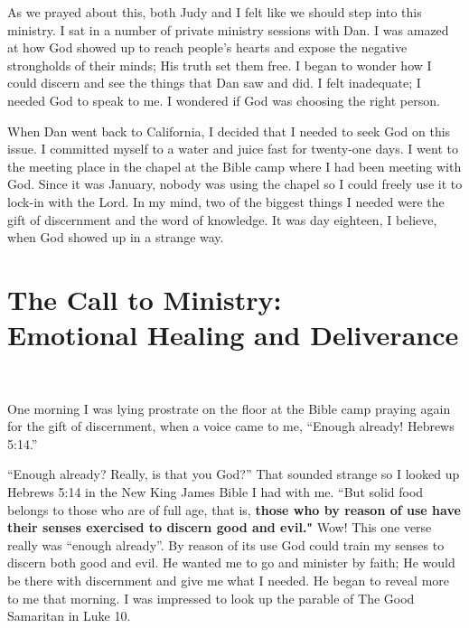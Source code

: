\documentclass[twoside, 12pt]{book}
\begin{document}
As we prayed about this, both Judy and I felt like we should step into this ministry. I sat in a number of private ministry sessions with Dan. I was amazed at how God showed up to reach people’s hearts and expose the negative strongholds of their minds; His truth set them free. I began to wonder how I could discern and see the things that Dan saw and did. I felt inadequate; I needed God to speak to me. I wondered if God was choosing the right person.

When Dan went back to California, I decided that I needed to seek God on this issue. I committed myself to a water and juice fast for twenty-one days. I went to the meeting place in the chapel at the Bible camp where I had been meeting with God. Since it was January, nobody was using the chapel so I could freely use it to lock-in with the Lord. In my mind, two of the biggest things I needed were the gift of discernment and the word of knowledge. It was day eighteen, I believe, when God showed up in a strange way.

\section{The Call to Ministry: \\ Emotional Healing and Deliverance}
\
\thispagestyle{emptyhead}

One morning I was lying prostrate on the floor at the Bible camp praying again for the gift of discernment, when a voice came to me, “Enough already! Hebrews 5:14.” 

“Enough already? Really, is that you God?” That sounded strange so I looked up Hebrews 5:14 in the New King James Bible I had with me. “But solid food belongs to those who are of full age, that is, \textbf{those who by reason of use have their senses exercised to discern good and evil."} Wow! This one verse really was “enough already”. By reason of its use God could train my senses to discern both good and evil. He wanted me to go and minister by faith; He would be there with discernment and give me what I needed. He began to reveal more to me that morning. I was impressed to look up the parable of The Good Samaritan in Luke 10.
\end{document}
